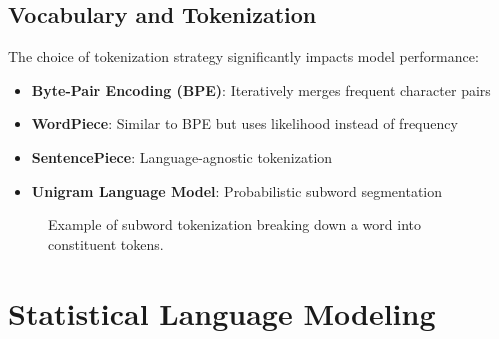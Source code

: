 \subsection{Vocabulary and Tokenization}
\noindent
The choice of tokenization strategy significantly impacts model performance:

\begin{itemize}
    \item \textbf{Byte-Pair Encoding (BPE)}: Iteratively merges frequent character pairs
    \item \textbf{WordPiece}: Similar to BPE but uses likelihood instead of frequency
    \item \textbf{SentencePiece}: Language-agnostic tokenization
    \item \textbf{Unigram Language Model}: Probabilistic subword segmentation
\end{itemize}

\begin{figure}[ht]
    \centering
    \caption{Example of subword tokenization breaking down a word into constituent tokens.}
    \label{fig:tokenization}
\end{figure}

\section{Statistical Language Modeling}
\label{sec:stat_lm}

